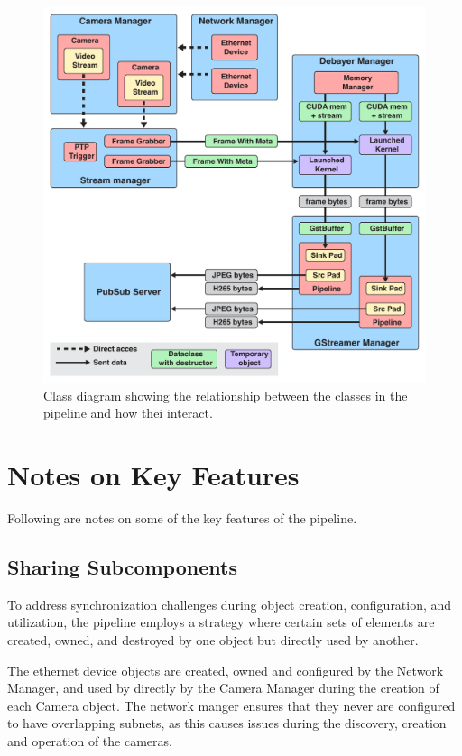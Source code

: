 \begin{figure}[H]
    \centering
    \includegraphics[width=\textwidth]{figures/object_overview.pdf}
    \caption{Class diagram showing the relationship between the classes in the pipeline and how thei interact.}
    \label{fig:object_overveiw}
\end{figure}

\section{Notes on Key Features}
Following are notes on some of the key features of the pipeline.

\subsection{Sharing Subcomponents}
To address synchronization challenges during object creation, configuration, and utilization, the pipeline employs a strategy where certain sets of elements are created, owned, and destroyed by one object but directly used by another.

The ethernet device objects are created, owned and configured by the Network Manager, and used by directly by the Camera Manager during the creation of each Camera object.
The network manger ensures that they never are configured to have overlapping subnets, as this causes issues during the discovery, creation and operation of the cameras.

